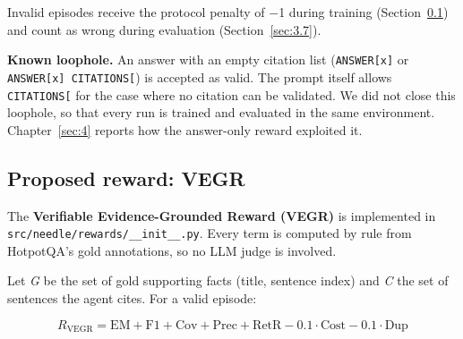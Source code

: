 Invalid episodes receive the protocol penalty of −1 during training
(Section~\ref{sec:3.4}) and count as wrong during evaluation
(Section~\ref{sec:3.7}).

\textbf{Known loophole.} An answer with an empty citation list
(\texttt{ANSWER{[}\allowbreak{}x{]}} or
\texttt{ANSWER{[}\allowbreak{}x{]} CITATIONS{[}\allowbreak{}{]}}) is
accepted as valid. The prompt itself allows
\texttt{CITATIONS{[}\allowbreak{}{]}} for the case where no citation can
be validated. We did not close this loophole, so that every run is
trained and evaluated in the same environment. Chapter~\ref{sec:4}
reports how the answer-only reward exploited it.

\subsection{Proposed reward: VEGR}\label{sec:3.4}

The \textbf{Verifiable Evidence-Grounded Reward (VEGR)} is implemented
in
\texttt{src/\allowbreak{}needle/\allowbreak{}rewards/\allowbreak{}\_\allowbreak{}\_\allowbreak{}init\_\allowbreak{}\_\allowbreak{}.\allowbreak{}py}.
Every term is computed by rule from HotpotQA's gold annotations, so no
LLM judge is involved.

Let \emph{G} be the set of gold supporting facts (title, sentence index)
and \emph{C} the set of sentences the agent cites. For a valid episode:

\[
R_{\text{VEGR}} = \text{EM} + \text{F1} + \text{Cov} + \text{Prec} + \text{RetR} - 0.1\cdot\text{Cost} - 0.1\cdot\text{Dup}
\]


